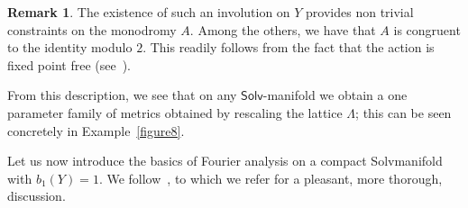 \documentclass[11pt]{article}
\theoremstyle{definition}
\newtheorem{rema}[theo]{Remark}
\numberwithin{equation}{section}
\numberwithin{figure}{section}
\numberwithin{table}{section}
\newcommand{\Solv}{\mathsf{Solv}}
\begin{document}
\begin{rema}\label{mod2}
The existence of such an involution on $Y$ provides non trivial constraints on the monodromy $A$. Among the others, we have that $A$ is congruent to the identity modulo $2$. This readily follows from the fact that the action is fixed point free (see~\cite[Section~6]{Sak}).
\end{rema}

From this description, we see that on any $\Solv$-manifold we obtain a one parameter family of metrics obtained by rescaling the lattice $\Lambda$; this can be seen concretely in Example~\ref{figure8}.


Let us now introduce the basics of Fourier analysis on a compact Solvmanifold with $b_1(Y)=1$. We follow~\cite[the first chapter]{Bre}, to which we refer for a pleasant, more thorough, discussion.
\end{document}
